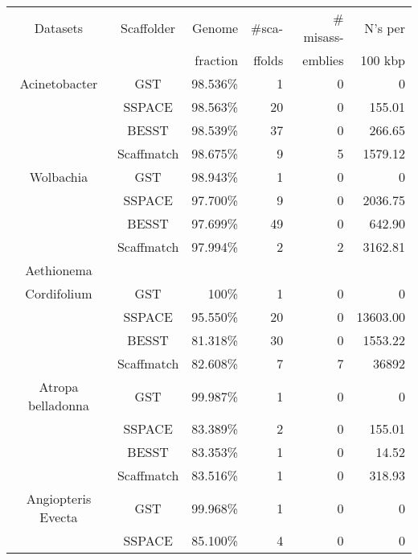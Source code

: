 \begin{table}
\small
    \centering
        \begin{tabular}{|c|c|r|r|r|r|} 
        \hline
    Datasets & Scaffolder & Genome  & \#sca- & \# misass-   & N's per  \\
       &  & fraction & ffolds & emblies  &  100 kbp \\
         \hline
         \hline
         Acinetobacter
         & GST & 98.536\% & 1 & 0 & 0 \\ 
         \hline   
         & SSPACE & 98.563\% & 20 & 0 & 155.01 \\ 
         \hline
         & BESST & 98.539\% & 37 & 0 & 266.65 \\ 
         \hline
         & Scaffmatch & 98.675\% & 9 & 5 & 1579.12 \\ 
         \hline
          \hline
          Wolbachia
          & GST & 98.943\% & 1 & 0 & 0 \\ 
          \hline   
          & SSPACE & 97.700\% & 9 & 0 & 2036.75 \\ 
          \hline
          & BESST & 97.699\% & 49 & 0 & 642.90 \\ 
          \hline
          & Scaffmatch & 97.994\% & 2 & 2 & 3162.81 \\ 
          \hline
          \hline
           Aethionema 
          &  & &  &  &  \\ 
          Cordifolium
          & GST & 100\% & 1 & 0 & 0 \\ 
          \hline   
          & SSPACE & 95.550\% & 20 & 0 & 13603.00 \\ 
          \hline
          & BESST & 81.318\% & 30 & 0 & 1553.22 \\ 
          \hline
          & Scaffmatch & 82.608\% & 7 & 7 & 36892 \\ 
          \hline
         \hline
         Atropa belladonna
         & GST & 99.987\% & 1 & 0 & 0 \\ 
         \hline   
     & SSPACE & 83.389\% & 2 & 0 & 155.01 \\ 
         \hline
         & BESST & 83.353\% & 1 & 0 & 14.52 \\ 
         \hline
         & Scaffmatch & 83.516\% & 1 & 0 & 318.93 \\ 
         \hline
         \hline
         Angiopteris Evecta
         & GST & 99.968\% & 1 & 0 & 0 \\ 
         \hline   
         & SSPACE & 85.100\% & 4 & 0 & 0 \\ 

\end{tabular}
\end{table}
